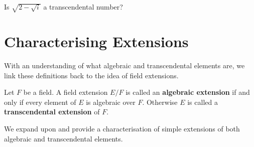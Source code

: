 \begin{exercise}
    Is $\sqrt{2 - \sqrt{i}}$ a transcendental number?
\end{exercise}

\newpage

\section{Characterising Extensions}
With an understanding of what algebraic and transcendental elements are, we link these definitions back to the idea of field extensions.

\begin{definition}
    Let $F$ be a field. A field extension $E/F$ is called an \textbf{algebraic extension} if and only if every element of $E$ is algebraic over $F$. Otherwise $E$ is called a \textbf{transcendental extension} of $F$.
\end{definition}

We expand upon  and provide a characterisation of simple extensions of both algebraic and transcendental elements.

